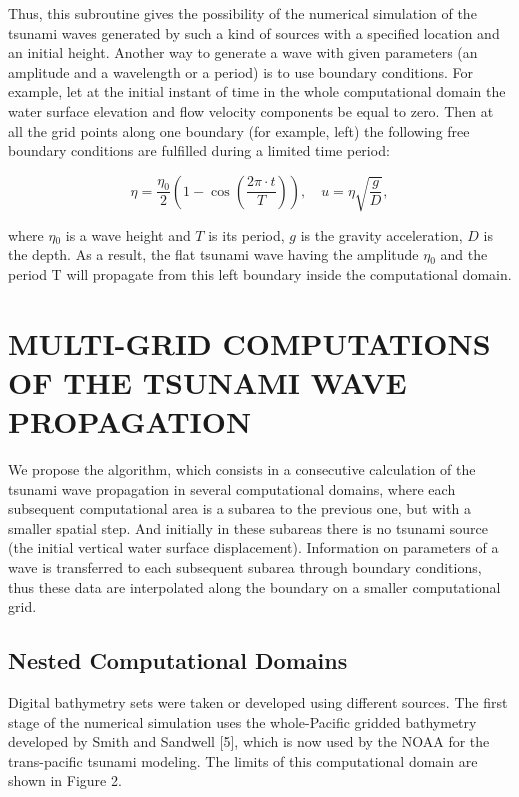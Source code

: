 \documentclass{aip-cp}
\begin{document}
Thus, this subroutine gives the possibility of the numerical simulation of 
the tsunami waves generated by such a kind of sources with a specified 
location and an initial height. Another way to generate a wave with given 
parameters (an amplitude and a wavelength or a period) is to use boundary 
conditions. For example, let at the initial instant of time in the whole 
computational domain the water surface elevation and flow velocity 
components be equal to zero. Then at all the grid points along one boundary 
(for example, left) the following free boundary conditions are fulfilled 
during a limited time period:

\begin{equation}
\label{eq7}
\eta = \frac{\eta _0 }{2}\left( {1 - \cos \left( {\frac{2\pi \cdot t}{T}} 
\right)} \right),
\quad
u = \eta \sqrt {\frac{g}{D}} ,
\end{equation}

\noindent
where \textit{$\eta $}$_{0}$ is a wave height and $T$ is its period, $g$ is the gravity 
acceleration, $D$ is the depth. As a result, the flat tsunami wave having the 
amplitude \textit{$\eta $}$_{0}$ and the period T will propagate from this left boundary 
inside the computational domain.

\section{MULTI-GRID COMPUTATIONS OF THE TSUNAMI WAVE PROPAGATION}

We propose the algorithm, which consists in a consecutive calculation of the 
tsunami wave propagation in several computational domains, where each 
subsequent computational area is a subarea to the previous one, but with a 
smaller spatial step. And initially in these subareas there is no tsunami 
source (the initial vertical water surface displacement). Information on 
parameters of a wave is transferred to each subsequent subarea through 
boundary conditions, thus these data are interpolated along the boundary on 
a smaller computational grid. 

\subsection{Nested Computational Domains}
Digital bathymetry sets were taken or 
developed using different sources. The first stage of the numerical 
simulation uses the whole-Pacific gridded bathymetry developed by Smith and 
Sandwell [5], which is now used by the NOAA for the trans-pacific tsunami 
modeling. The limits of this computational domain are shown in Figure 2.
\end{document}

